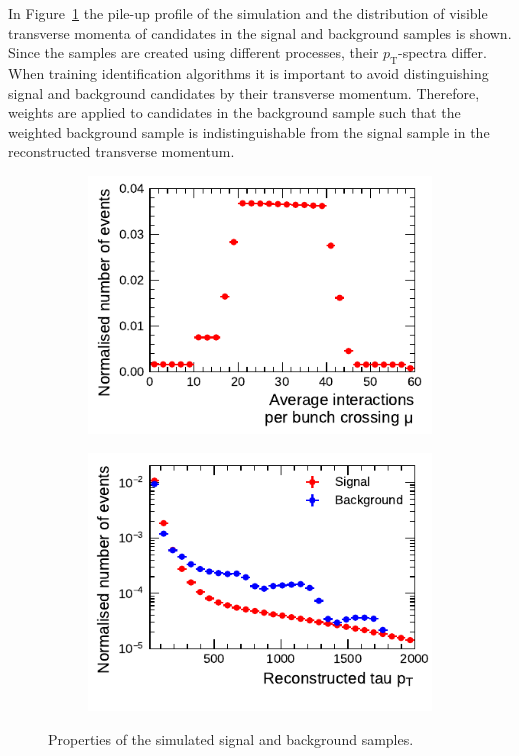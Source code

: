 In Figure~\ref{fig:pt_mu} the pile-up profile of the simulation and the
distribution of visible transverse momenta of \tauhadvis candidates in the
signal and background samples is shown. Since the samples are created using
different processes, their $p_\text{T}$-spectra differ. When training
identification algorithms it is important to avoid distinguishing signal and
background candidates by their transverse momentum. Therefore, weights are
applied to \tauhadvis candidates in the background sample such that the weighted
background sample is indistinguishable from the signal sample in the
reconstructed transverse momentum.

\begin{figure}[htb]
  \centering
  \begin{subfigure}[t]{0.48\textwidth}
    \centering
    \includegraphics{./figures/bdt_perf/pt_mu_samples/mu.pdf}
  \end{subfigure}\hfill
  \begin{subfigure}[t]{0.48\textwidth}
    \centering
    \includegraphics{./figures/bdt_perf/pt_mu_samples/pt.pdf}
  \end{subfigure}
  \caption{Properties of the simulated signal and background samples.}
  \label{fig:pt_mu}
\end{figure}

